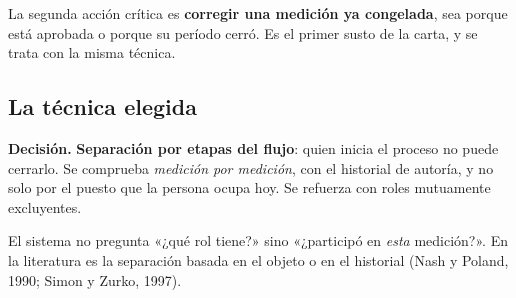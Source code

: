 \documentclass[11pt,letterpaper]{article}
\begin{document}
La segunda acción crítica es \textbf{corregir una medición ya congelada}, sea porque está aprobada o
porque su período cerró. Es el primer susto de la carta, y se trata con la misma técnica.

\subsection{La técnica elegida}
\label{sec:tecnica}

\begin{decision}
\textbf{Decisión.} \textbf{Separación por etapas del flujo}: quien inicia el proceso no puede cerrarlo. Se
comprueba \emph{medición por medición}, con el historial de autoría, y no solo por el puesto que la
persona ocupa hoy. Se refuerza con roles mutuamente excluyentes.
\end{decision}

El sistema no pregunta «¿qué rol tiene?» sino «¿participó en \emph{esta} medición?». En la literatura
es la separación basada en el objeto o en el historial (Nash y Poland, 1990; Simon y Zurko, 1997).
\end{document}
